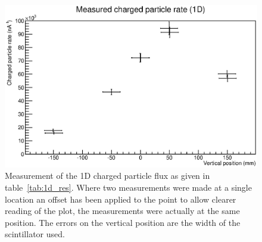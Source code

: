 \begin{table}
  \label{tab:1d_res}
\end{table}


\begin{figure}[hptb]
  \centering
  \includegraphics[width=.8\textwidth]{images/plot_generating_scripts/measured_1d_charged_flux.eps}
  \caption{Measurement of the 1D charged particle flux as given in table~\ref{tab:1d_res}. Where two measurements were made at a single location an offset has been applied to the point to allow clearer reading of the plot, the measurements were actually at the same position. The errors on the vertical position are the width of the scintillator used.}
  \label{fig:images_hit_rate_rescaled}
\end{figure}


